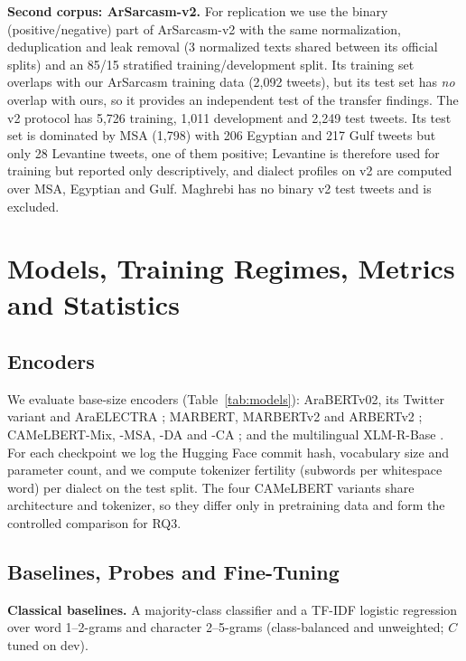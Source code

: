 \documentclass[11pt]{article}
\begin{document}
\textbf{Second corpus: ArSarcasm-v2.} For replication we use the binary (positive/negative) part of ArSarcasm-v2 \cite{abufarha2021arsarcasmv2} with the same normalization, deduplication and leak removal (3 normalized texts shared between its official splits) and an 85/15 stratified training/development split. Its training set overlaps with our ArSarcasm training data (2,092 tweets), but its test set has \emph{no} overlap with ours, so it provides an independent test of the transfer findings. The v2 protocol has 5,726 training, 1,011 development and 2,249 test tweets. Its test set is dominated by MSA (1,798) with 206 Egyptian and 217 Gulf tweets but only 28 Levantine tweets, one of them positive; Levantine is therefore used for training but reported only descriptively, and dialect profiles on v2 are computed over MSA, Egyptian and Gulf. Maghrebi has no binary v2 test tweets and is excluded.

\section{Models, Training Regimes, Metrics and Statistics}
\label{sec:methodology}
\subsection{Encoders}
We evaluate \nEnc{} base-size encoders (Table~\ref{tab:models}): AraBERTv02, its Twitter variant \cite{antoun2020arabert} and AraELECTRA \cite{antoun2021araelectra}; MARBERT, MARBERTv2 \cite{abdulmageed2021arbert} and ARBERTv2 \cite{elmadany2023orca}; CAMeLBERT-Mix, -MSA, -DA and -CA \cite{inoue2021interplay}; and the multilingual XLM-R-Base \cite{conneau2020xlmr}. For each checkpoint we log the Hugging Face commit hash, vocabulary size and parameter count, and we compute tokenizer fertility (subwords per whitespace word) per dialect on the test split. The four CAMeLBERT variants share architecture and tokenizer, so they differ only in pretraining data and form the controlled comparison for RQ3.

\begin{table}[tbp]
\caption{Encoder audit: parameters, vocabulary, tokenizer fertility on MSA and on the mean of the three dialects (DA), and Hugging Face commit.}
\label{tab:models}
\centering
\footnotesize
\setlength{\tabcolsep}{3.5pt}
\end{table}

\subsection{Baselines, Probes and Fine-Tuning}
\label{sec:regimes}
\textbf{Classical baselines.} A majority-class classifier and a TF-IDF logistic regression over word 1--2-grams and character 2--5-grams (class-balanced and unweighted; $C$ tuned on dev).
\end{document}
